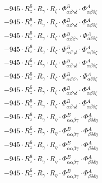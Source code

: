 \documentclass{article}
\begin{document}
\begin{subequations}
\begin{gather}
\begin{array}{c}
 \\[0.2em] 		 - 945 \cdot R_{z}^{6} \cdot R_{\gamma{}} \cdot R_{\zeta{}} \cdot \Phi{}^{B}_{\alpha{}\beta{}\gamma{}\delta{}} \cdot \Phi{}^{A}_{\alpha{}\beta{}\delta{}\zeta{}} 
 \\[0.2em] 		 - 945 \cdot R_{z}^{6} \cdot R_{\gamma{}} \cdot R_{\zeta{}} \cdot \Phi{}^{B}_{\alpha{}\beta{}\gamma{}\delta{}} \cdot \Phi{}^{A}_{\alpha{}\beta{}\delta{}\zeta{}} 
 \\[0.2em] 		 - 945 \cdot R_{z}^{6} \cdot R_{\gamma{}} \cdot R_{\zeta{}} \cdot \Phi{}^{B}_{\alpha{}\beta{}\beta{}\gamma{}} \cdot \Phi{}^{A}_{\alpha{}\delta{}\delta{}\zeta{}} 
 \\[0.2em] 		 - 945 \cdot R_{z}^{6} \cdot R_{\gamma{}} \cdot R_{\zeta{}} \cdot \Phi{}^{B}_{\alpha{}\beta{}\gamma{}\delta{}} \cdot \Phi{}^{A}_{\alpha{}\beta{}\delta{}\zeta{}} 
 \\[0.2em] 		 - 945 \cdot R_{z}^{6} \cdot R_{\gamma{}} \cdot R_{\zeta{}} \cdot \Phi{}^{B}_{\alpha{}\beta{}\gamma{}\delta{}} \cdot \Phi{}^{A}_{\alpha{}\beta{}\delta{}\zeta{}} 
 \\[0.2em] 		 - 945 \cdot R_{z}^{6} \cdot R_{\gamma{}} \cdot R_{\zeta{}} \cdot \Phi{}^{B}_{\alpha{}\beta{}\beta{}\gamma{}} \cdot \Phi{}^{A}_{\alpha{}\delta{}\delta{}\zeta{}} 
 \\[0.2em] 		 - 945 \cdot R_{z}^{6} \cdot R_{\gamma{}} \cdot R_{\zeta{}} \cdot \Phi{}^{B}_{\alpha{}\beta{}\gamma{}\delta{}} \cdot \Phi{}^{A}_{\alpha{}\beta{}\delta{}\zeta{}} 
 \\[0.2em] 		 - 945 \cdot R_{z}^{6} \cdot R_{\gamma{}} \cdot R_{\zeta{}} \cdot \Phi{}^{B}_{\alpha{}\beta{}\gamma{}\delta{}} \cdot \Phi{}^{A}_{\alpha{}\beta{}\delta{}\zeta{}} 
 \\[0.2em] 		 - 945 \cdot R_{z}^{6} \cdot R_{\gamma{}} \cdot R_{\eta{}} \cdot \Phi{}^{B}_{\alpha{}\alpha{}\beta{}\gamma{}} \cdot \Phi{}^{A}_{\beta{}\delta{}\delta{}\eta{}} 
 \\[0.2em] 		 - 945 \cdot R_{z}^{6} \cdot R_{\gamma{}} \cdot R_{\eta{}} \cdot \Phi{}^{B}_{\alpha{}\alpha{}\beta{}\gamma{}} \cdot \Phi{}^{A}_{\beta{}\delta{}\delta{}\eta{}} 
 \\[0.2em] 		 - 945 \cdot R_{z}^{6} \cdot R_{\gamma{}} \cdot R_{\eta{}} \cdot \Phi{}^{B}_{\alpha{}\alpha{}\beta{}\gamma{}} \cdot \Phi{}^{A}_{\beta{}\delta{}\delta{}\eta{}} 
 \\[0.2em] 		 - 945 \cdot R_{z}^{6} \cdot R_{\gamma{}} \cdot R_{\eta{}} \cdot \Phi{}^{B}_{\alpha{}\alpha{}\beta{}\gamma{}} \cdot \Phi{}^{A}_{\beta{}\delta{}\delta{}\eta{}} 
 \\[0.2em] 		 - 945 \cdot R_{z}^{6} \cdot R_{\gamma{}} \cdot R_{\eta{}} \cdot \Phi{}^{B}_{\alpha{}\alpha{}\beta{}\gamma{}} \cdot \Phi{}^{A}_{\beta{}\delta{}\delta{}\eta{}} 

\end{array}
\end{gather}
\end{subequations}
\end{document}
